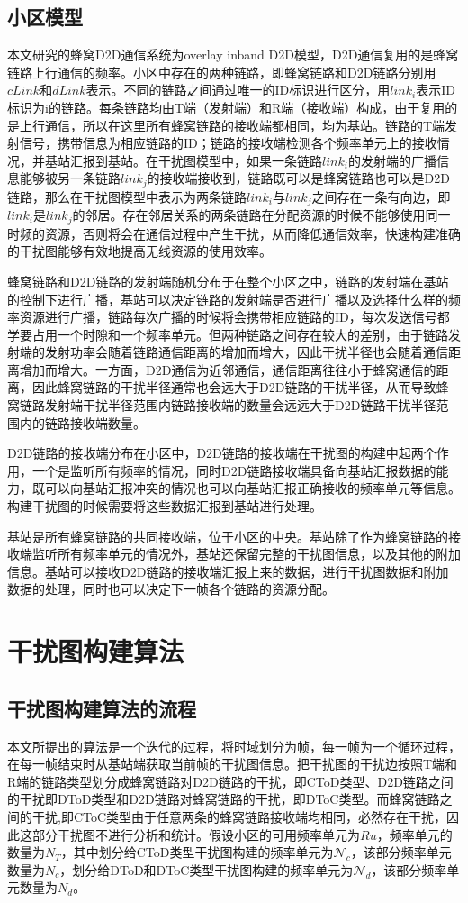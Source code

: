 \documentclass[figurelist,tablelist,algorithmlist,nomlist,masters]{seuthesix}
\begin{document}
	\subsection{小区模型}
	本文研究的蜂窝D2D通信系统为overlay inband D2D模型，D2D通信复用的是蜂窝链路上行通信的频率。小区中存在的两种链路，即蜂窝链路和D2D链路分别用$cLink$和$dLink$表示。不同的链路之间通过唯一的ID标识进行区分，用$link_i$表示ID标识为i的链路。每条链路均由T端（发射端）和R端（接收端）构成，由于复用的是上行通信，所以在这里所有蜂窝链路的接收端都相同，均为基站。链路的T端发射信号，携带信息为相应链路的ID；链路的接收端检测各个频率单元上的接收情况，并基站汇报到基站。在干扰图模型中，如果一条链路$link_i$的发射端的广播信息能够被另一条链路$link_j$的接收端接收到，链路既可以是蜂窝链路也可以是D2D链路，那么在干扰图模型中表示为两条链路$link_i$与$link_j$之间存在一条有向边，即$link_i$是$link_j$的邻居。存在邻居关系的两条链路在分配资源的时候不能够使用同一时频的资源，否则将会在通信过程中产生干扰，从而降低通信效率，快速构建准确的干扰图能够有效地提高无线资源的使用效率。

	蜂窝链路和D2D链路的发射端随机分布于在整个小区之中，链路的发射端在基站的控制下进行广播，基站可以决定链路的发射端是否进行广播以及选择什么样的频率资源进行广播，链路每次广播的时候将会携带相应链路的ID，每次发送信号都学要占用一个时隙和一个频率单元。但两种链路之间存在较大的差别，由于链路发射端的发射功率会随着链路通信距离的增加而增大，因此干扰半径也会随着通信距离增加而增大。一方面，D2D通信为近邻通信，通信距离往往小于蜂窝通信的距离，因此蜂窝链路的干扰半径通常也会远大于D2D链路的干扰半径，从而导致蜂窝链路发射端干扰半径范围内链路接收端的数量会远远大于D2D链路干扰半径范围内的链路接收端数量。

	D2D链路的接收端分布在小区中，D2D链路的接收端在干扰图的构建中起两个作用，一个是监听所有频率的情况，同时D2D链路接收端具备向基站汇报数据的能力，既可以向基站汇报冲突的情况也可以向基站汇报正确接收的频率单元等信息。构建干扰图的时候需要将这些数据汇报到基站进行处理。

	基站是所有蜂窝链路的共同接收端，位于小区的中央。基站除了作为蜂窝链路的接收端监听所有频率单元的情况外，基站还保留完整的干扰图信息，以及其他的附加信息。基站可以接收D2D链路的接收端汇报上来的数据，进行干扰图数据和附加数据的处理，同时也可以决定下一帧各个链路的资源分配。


	\section{干扰图构建算法}

	\subsection{干扰图构建算法的流程}
	本文所提出的算法是一个迭代的过程，将时域划分为帧，每一帧为一个循环过程，在每一帧结束时从基站端获取当前帧的干扰图信息。把干扰图的干扰边按照T端和R端的链路类型划分成蜂窝链路对D2D链路的干扰，即CToD类型、D2D链路之间的干扰即DToD类型和D2D链路对蜂窝链路的干扰，即DToC类型。而蜂窝链路之间的干扰,即CToC类型由于任意两条的蜂窝链路接收端均相同，必然存在干扰，因此这部分干扰图不进行分析和统计。假设小区的可用频率单元为$Ru$，频率单元的数量为$N_T$，其中划分给CToD类型干扰图构建的频率单元为$\mathcal{N}_c$，该部分频率单元数量为$N_c$，划分给DToD和DToC类型干扰图构建的频率单元为$\mathcal{N}_d$，该部分频率单元数量为$N_d$。
\end{document}

